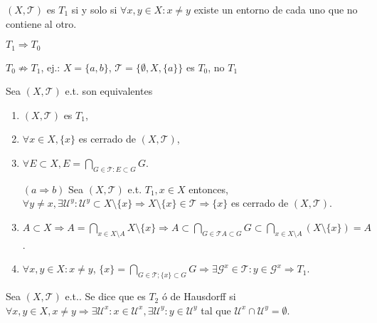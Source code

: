 \begin{obs}
  $( X, \mathcal{T} )$ es $T_{1}$ si y solo si $\forall x, y \in X : x \neq y$ existe un entorno de cada uno que no contiene al otro.
\end{obs}

\begin{obs}
  $T_{1} \Rightarrow T_{0}$
\end{obs}

\begin{obs}
  $T_{0} \not \Rightarrow T_{1}$, ej.: $X = \{ a, b \}$, $\mathcal{T} = \{ \emptyset, X, \{ a \} \}$ es $T_{0}$, no $T_{1}$
\end{obs}

\begin{prop}
  Sea $( X, \mathcal{T} )$ e.t. son equivalentes
  \begin{enumerate}[label=(\roman*)]
    \item $( X, \mathcal{T} )$ es $T_{1}$,
    \item $\forall x \in X, \{ x \}$ es cerrado de $( X, \mathcal{T} )$,
    \item $\forall E \subset X, E = \bigcap_{G \in \mathcal{T}: E \subset G} G$.
  \end{enumerate}
\end{prop}

\begin{dem}
  \begin{enumerate}[label=(\roman*)]
    \item []
    \item [$  (a \Rightarrow b)$] Sea $( X, \mathcal{T} )$ e.t. $T_{1}, x \in X$ entonces, $\forall y \neq x, \exists \mathcal{U}^{y}: \mathcal{U}^{y} \subset X \setminus \{ x \} \Rightarrow X \setminus \{ x \} \in \mathcal{T} \Rightarrow \{ x \}$ es cerrado de $( X, \mathcal{T} )$.
    \item $A \subset X \Rightarrow A = \bigcap_{x \in X \setminus A} X \setminus \{ x \} \Rightarrow A \subset \bigcap_{G \in \mathcal{T} A \subset G} G \subset \bigcap_{x \in X \setminus A} (X \setminus \{ x \}) = A$.
    \item $\forall x, y \in X : x \neq y$, $\{ x \} = \bigcap_{G \in \mathcal{T}; \{ x \} \subset G} G \Rightarrow \exists \mathcal{G}^{x} \in \mathcal{T} : y \in \mathcal{G}^{x} \Rightarrow T_{1}$.
  \end{enumerate}
\end{dem}

\begin{defn}[$T_2$]
  Sea $( X, \mathcal{T} )$ e.t.. Se dice que es $T_{2}$ ó de Hausdorff si $\forall x, y \in X, x \neq y \Rightarrow \exists \mathcal{U}^{x}: x \in \mathcal{U}^{x}, \exists \mathcal{U}^{y}: y \in \mathcal{U}^{y}$ tal que $\mathcal{U}^{x} \cap \mathcal{U}^{y} = \emptyset$.
\end{defn}

